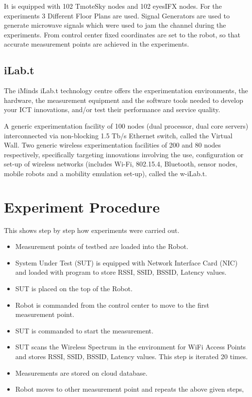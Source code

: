 \documentclass[11pt,a4paper,headinclude,footinclude,chapterprefix=on]{scrreprt}
\begin{document}
It is equipped with 102 TmoteSky nodes and 102 eyesIFX nodes. For the experiments 3 Different Floor Plans are used. Signal Generators are used to generate microwave signals which were used to jam the channel during the experiments. From control center fixed coordinates
are set to the robot, so that accurate measurement points are achieved in the experiments. 

\subsection{iLab.t}
The iMinds iLab.t technology centre offers the experimentation environments, the hardware, the measurement equipment and the software tools needed to develop your ICT innovations, and/or test their performance and service quality.

A generic experimentation facility of 100 nodes (dual processor, dual core servers) interconnected via non-blocking 1.5 Tb/s Ethernet switch, called the Virtual Wall. Two generic wireless experimentation facilities of 200 and 80 nodes respectively, specifically targeting innovations involving the use, configuration or set-up of wireless networks (includes Wi-Fi, 802.15.4, Bluetooth, sensor nodes, mobile robots and a mobility emulation set-up), called the w-iLab.t.

\section{Experiment Procedure}
This shows step by step how experiments were carried out. 
\begin{itemize}
\item Measurement points of testbed are loaded into the Robot. 
\item System Under Test (SUT) is equipped with Network Interface Card (NIC) and loaded with program to store RSSI, SSID, BSSID, Latency values.
\item SUT is placed on the top of the Robot.
\item Robot is commanded from the control center to move to the first measurement point.
\item SUT is commanded to start the measurement.
\item SUT scans the Wireless Spectrum in the environment for WiFi Access Points and stores RSSI, SSID, BSSID, Latency values. This step is iterated 20 times.
\item Measurements are stored on cloud database.
\item Robot moves to other measurement point and repeats the above given steps‚
\end{itemize}
\end{document}
